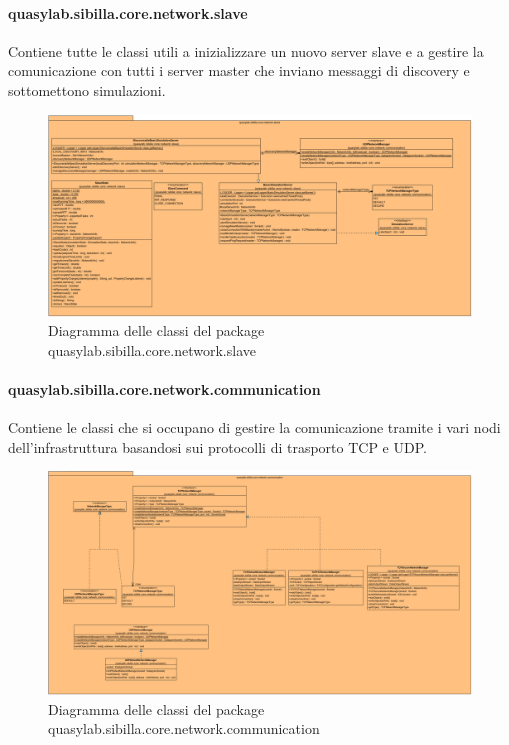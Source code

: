 \paragraph{quasylab.sibilla.core.network.slave} Contiene tutte le classi utili a inizializzare un nuovo server slave e a gestire la comunicazione con tutti i server master che inviano messaggi di discovery e sottomettono simulazioni.

\begin{figure}[H]
    \includegraphics[width=\linewidth]{images/quasylab.sibilla.core.network.slave.png}
    \captionsetup{justification=centering}
    \caption{Diagramma delle classi del package quasylab.sibilla.core.network.slave}
  \end{figure}

\paragraph{quasylab.sibilla.core.network.communication} Contiene le classi che si occupano di gestire la comunicazione tramite i vari nodi dell’infrastruttura basandosi sui protocolli di trasporto TCP e UDP. 

\begin{figure}[H]
    \includegraphics[width=\linewidth]{images/quasylab.sibilla.core.network.communication.png}
    \captionsetup{justification=centering}
    \caption{Diagramma delle classi del package quasylab.sibilla.core.network.communication}
  \end{figure}


